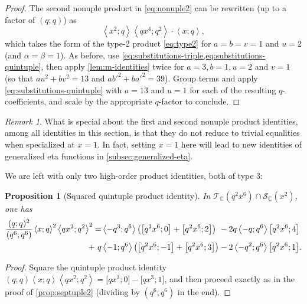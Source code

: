 \documentclass[reqno,11pt]{amsart}
\newtheorem{proposition}[theorem]{Proposition}
\theoremstyle{definition}
\theoremstyle{remark}
\newtheorem*{remark}{Remark}
\numberwithin{equation}{section}
\newcommand{\C}{\mathbb{C}}
\newcommand{\mT}{\mathcal{T}}
\newcommand{\mS}{\mathcal{S}}
\newcommand{\la}{\left\langle}
\newcommand{\ra}{\right\rangle}
\newcommand{\vect}[2]{\big[{#1};{#2}\big]}
\begin{document}
\begin{proof}
The second nonuple product in \cref{eq:nonuple2} can be rewritten (up to a factor of $(q; q)$) as
\[
    \la x^2; q \ra \la qx^4; q^2 \ra \cdot \la x; q \ra,
\]
which takes the form of the type-2 product \cref{eq:type2} for $a = b = v = 1$ and $u = 2$ (and $\alpha = \beta = 1$). As before, use \cref{eq:substitutions-triple,eq:substitutions-quintuple}, then apply \cref{lem:m-identities} twice for $a = 3, b = 1, u = 2$ and $v = 1$ (so that $au^2 + bv^2 = 13$ and $ab'^2 + ba'^2 = 39$). Group terms and apply \cref{eq:substitutions-quintuple} with $a = 13$ and $u = 1$ for each of the resulting $q$-coefficients, and scale by the appropriate $q$-factor to conclude.
\end{proof}

\begin{remark}
What is special about the first and second nonuple product identities, among all identities in this section, is that they do not reduce to trivial equalities when specialized at $x = 1$. In fact, setting $x = 1$ here will lead to new identities of generalized eta functions in \cref{subsec:generalized-eta}.
\end{remark}

We are left with only two high-order product identities, both of type 3:
\begin{proposition}[Squared quintuple product identity] \label{prop:squared-quintuple}
In $\mT_\C\left(q^2x^6\right) \cap \mS_\C\left(x^2\right)$, one has
\[
\begin{aligned}
    \frac{(q; q)^2}{\left(q^6; q^6\right)} \la x; q \ra^2 \la qx^2; q^2 \ra^2 
    = 
    &\la-q^3; q^6 \ra \left(\vect{q^2x^6}{0} + \vect{q^2x^6}{2}\right)\hspace{0.12cm} - 2q\la-q; q^6 \ra\vect{q^2x^6}{4} \\
    +\ q&\la-1; q^6 \ra \left(\vect{q^2x^6}{-1} + \vect{q^2x^6}{3}\right) - 2\la-q^2; q^6 \ra \vect{q^2x^6}{1}.
\end{aligned}
\]
\end{proposition}
\begin{proof}
Square the quintuple product identity $(q; q)\la x; q\ra \la qx^2; q^2\ra = \vect{qx^3}{0} - \vect{qx^3}{1}$, and then proceed exactly as in the proof of \cref{prop:septuple2} (dividing by $(q^6; q^6)$ in the end).
\end{proof}
\end{document}

